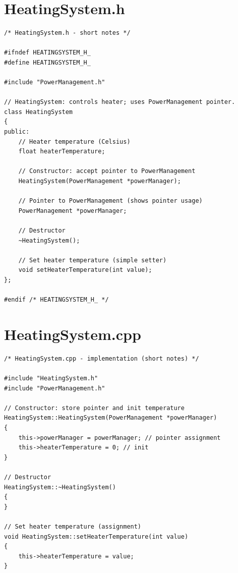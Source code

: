 \documentclass[11pt]{article}
\begin{document}
\section*{HeatingSystem.h}
\begin{lstlisting}
/* HeatingSystem.h - short notes */

#ifndef HEATINGSYSTEM_H_
#define HEATINGSYSTEM_H_

#include "PowerManagement.h"

// HeatingSystem: controls heater; uses PowerManagement pointer.
class HeatingSystem
{
public:
    // Heater temperature (Celsius)
    float heaterTemperature;

    // Constructor: accept pointer to PowerManagement
    HeatingSystem(PowerManagement *powerManager);

    // Pointer to PowerManagement (shows pointer usage)
    PowerManagement *powerManager;

    // Destructor
    ~HeatingSystem();

    // Set heater temperature (simple setter)
    void setHeaterTemperature(int value);
};

#endif /* HEATINGSYSTEM_H_ */
\end{lstlisting}

\section*{HeatingSystem.cpp}
\begin{lstlisting}
/* HeatingSystem.cpp - implementation (short notes) */

#include "HeatingSystem.h"
#include "PowerManagement.h"

// Constructor: store pointer and init temperature
HeatingSystem::HeatingSystem(PowerManagement *powerManager)
{
    this->powerManager = powerManager; // pointer assignment
    this->heaterTemperature = 0; // init
}

// Destructor
HeatingSystem::~HeatingSystem()
{
}

// Set heater temperature (assignment)
void HeatingSystem::setHeaterTemperature(int value)
{
    this->heaterTemperature = value;
}
\end{lstlisting}
\end{document}

